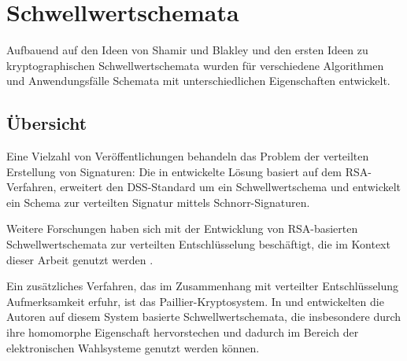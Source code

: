 \section{Schwellwertschemata}

\label{sec_state_threshold}





Aufbauend auf den Ideen von Shamir und Blakley und den ersten Ideen zu kryptographischen Schwellwertschemata wurden für verschiedene Algorithmen und Anwendungsfälle Schemata mit unterschiedlichen Eigenschaften entwickelt.

\subsection{Übersicht}

Eine Vielzahl von Veröffentlichungen behandeln das Problem der verteilten Erstellung von Signaturen: Die in \cite{shoup2000practical} entwickelte Lösung basiert auf dem RSA-Verfahren, \cite{gennaro1996robustdss} erweitert den DSS-Standard um ein Schwellwertschema und \cite{stinson2001provably} entwickelt ein Schema zur verteilten Signatur mittels Schnorr-Signaturen.

Weitere Forschungen haben sich mit der Entwicklung von RSA-basierten Schwellwertschemata zur verteilten Entschlüsselung beschäftigt, die im Kontext dieser Arbeit genutzt werden \cite{frankel1997proactive, gennaro1996robust, rabin1998simplified}. 

Ein zusätzliches Verfahren, das im Zusammenhang mit verteilter Entschlüsselung Aufmerksamkeit erfuhr, ist das Paillier-Kryptosystem. In \cite{damgard2001} und \cite{fouque2000sharing} entwickelten die Autoren auf diesem System basierte Schwellwertschemata, die insbesondere durch ihre homomorphe Eigenschaft hervorstechen und dadurch im Bereich der elektronischen Wahlsysteme genutzt werden können.

